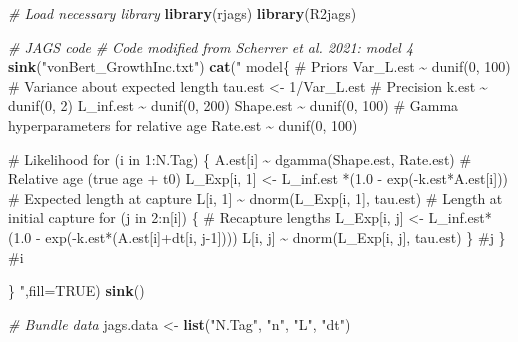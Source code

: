 \documentclass[
]{krantz}
\makeatletter
\newenvironment{Shaded}{\begin{snugshade}}{\end{snugshade}}
\newcommand{\AttributeTok}[1]{\textcolor[rgb]{0.27,0.27,0.27}{#1}}
\newcommand{\CommentTok}[1]{\textcolor[rgb]{0.37,0.37,0.37}{\textit{#1}}}
\newcommand{\ConstantTok}[1]{\textcolor[rgb]{0.37,0.37,0.37}{#1}}
\newcommand{\FunctionTok}[1]{\textcolor[rgb]{0.27,0.27,0.27}{\textbf{#1}}}
\newcommand{\NormalTok}[1]{#1}
\newcommand{\OtherTok}[1]{\textcolor[rgb]{0.37,0.37,0.37}{#1}}
\newcommand{\StringTok}[1]{\textcolor[rgb]{0.5,0.5,0.5}{#1}}
\newenvironment{kframe}{%
\medskip{}
\setlength{\fboxsep}{.8em}
 \def\at@end@of@kframe{}%
 \ifinner\ifhmode%
  \def\at@end@of@kframe{\end{minipage}}%
  \begin{minipage}{\columnwidth}%
 \fi\fi%
 \def\FrameCommand##1{\hskip\@totalleftmargin \hskip-\fboxsep
 \colorbox{shadecolor}{##1}\hskip-\fboxsep
     \hskip-\linewidth \hskip-\@totalleftmargin \hskip\columnwidth}%
 \MakeFramed {\advance\hsize-\width
   \@totalleftmargin\z@ \linewidth\hsize
   \@setminipage}}%
 {\par\unskip\endMakeFramed%
 \at@end@of@kframe}
\renewenvironment{Shaded}{\begin{kframe}}{\end{kframe}}
\makeatother
\begin{document}
\begin{Shaded}
\begin{Highlighting}[]
\CommentTok{\# Load necessary library}
\FunctionTok{library}\NormalTok{(rjags)}
\FunctionTok{library}\NormalTok{(R2jags)}

\CommentTok{\# JAGS code}
\CommentTok{\# Code modified from Scherrer et al. 2021: model 4}
\FunctionTok{sink}\NormalTok{(}\StringTok{"vonBert\_GrowthInc.txt"}\NormalTok{)}
\FunctionTok{cat}\NormalTok{(}\StringTok{"}
\StringTok{model\{}
\StringTok{\# Priors}
\StringTok{  Var\_L.est \textasciitilde{} dunif(0, 100) \# Variance about expected length}
\StringTok{  tau.est \textless{}{-} 1/Var\_L.est \# Precision}
\StringTok{    k.est \textasciitilde{} dunif(0, 2)}
\StringTok{    L\_inf.est \textasciitilde{} dunif(0, 200)}
\StringTok{    Shape.est \textasciitilde{} dunif(0, 100) \# Gamma hyperparameters for relative age}
\StringTok{    Rate.est \textasciitilde{} dunif(0, 100)}

\StringTok{    \# Likelihood}
\StringTok{    for (i in 1:N.Tag)   \{}
\StringTok{        A.est[i] \textasciitilde{} dgamma(Shape.est, Rate.est) \# Relative age (true age + t0)}
\StringTok{        L\_Exp[i, 1] \textless{}{-}   L\_inf.est *(1.0 {-} exp({-}k.est*A.est[i])) \# Expected length at capture}
\StringTok{        L[i, 1] \textasciitilde{} dnorm(L\_Exp[i, 1], tau.est) \# Length at initial capture}
\StringTok{        for (j in 2:n[i])   \{ \# Recapture lengths}
\StringTok{            L\_Exp[i, j] \textless{}{-}  L\_inf.est*(1.0 {-} exp({-}k.est*(A.est[i]+dt[i, j{-}1])))}
\StringTok{            L[i, j] \textasciitilde{} dnorm(L\_Exp[i, j], tau.est)}
\StringTok{        \} \#j}
\StringTok{    \} \#i}

\StringTok{\}}
\StringTok{    "}\NormalTok{,}\AttributeTok{fill=}\ConstantTok{TRUE}\NormalTok{)}
\FunctionTok{sink}\NormalTok{()}

\CommentTok{\# Bundle data}
\NormalTok{jags.data }\OtherTok{\textless{}{-}} \FunctionTok{list}\NormalTok{(}\StringTok{"N.Tag"}\NormalTok{, }\StringTok{"n"}\NormalTok{, }\StringTok{"L"}\NormalTok{, }\StringTok{"dt"}\NormalTok{)}


\end{Highlighting}
\end{Shaded}
\end{document}

